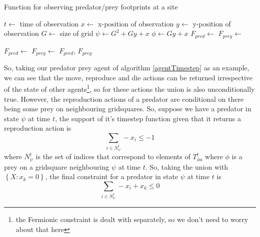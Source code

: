 \documentclass{article}
\begin{document}
\begin{algorithm}
	\caption{Function for observing predator/prey footprints at a site}
	\label{observationFunc}
	\begin{algorithmic}
		 
		\State $t \leftarrow$ time of observation
		\State $x \leftarrow$ x-position of observation
		\State $y \leftarrow$ y-position of observation
		\State $G \leftarrow$ size of grid
		\State $\psi \leftarrow G^2 + Gy + x$     
		\State $\phi \leftarrow Gy + x$     
		\State $F_{pred} \leftarrow$   
		\State $F_{prey} \leftarrow$   
		
		\State $F_{pred} \leftarrow$ 
		\EndIf
		\State $F_{prey} \leftarrow$ 
		\EndIf
		\State\Return $F_{pred}$, $F_{prey}$
		\EndFunction
	\end{algorithmic}
\end{algorithm}

So, taking our predator prey agent of algorithm \ref{agentTimestep} as an example, we can see that the move, reproduce and die actions can be returned irrespective of the state of other agents\footnote{the Fermionic constraint is dealt with separately, so we don't need to worry about that here}, so for these actions the union is also unconditionally true. However, the reproduction actions of a predator are conditional on there being some prey on neighbouring gridsquares. So, suppose we have a predator in state $\psi$ at time $t$, the support of it's timestep function given that it returns a reproduction action is
\[
\sum_{i \in N^t_\psi} -x_i \le -1
\]
where $N^t_\psi$ is the set of indices that correspond to elements of $T^t_{\phi a}$ where $\phi$ is a prey on a gridsquare neighbouring $\psi$ at time $t$. So, taking the union with $\left\{X: x_k = 0\right\}$, the final constraint for a predator in state $\psi$ at time $t$ is
\[
\sum_{i \in N^t_\psi} -x_i  + x_k  \le 0
\]
\end{document}
